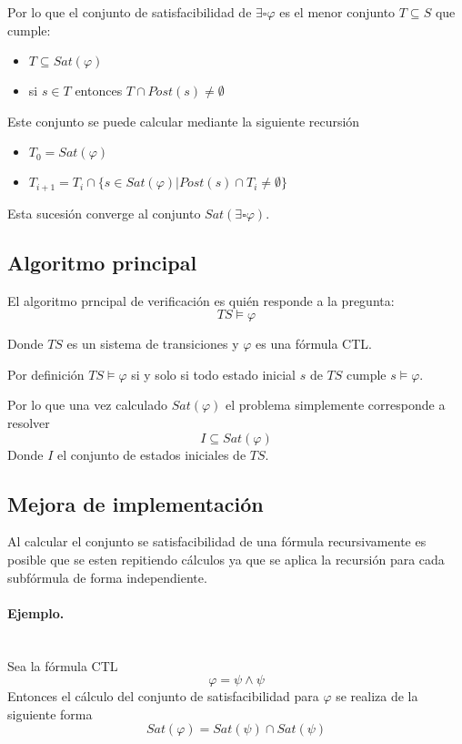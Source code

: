Por lo que el conjunto de satisfacibilidad de $\exists \square \varphi$ es el
 menor conjunto $T \subseteq S$ que cumple:

\begin{itemize}
\item $T \subseteq Sat(\varphi)$
\item si $s \in T$ entonces $T \cap Post(s) \neq \emptyset$

\end{itemize}

Este conjunto se puede calcular mediante la siguiente recursión
\begin{itemize}
\item $T_0 = Sat(\varphi)$
\item $T_{i+1} = T_i \cap \{ s \in Sat(\varphi) | Post(s) \cap T_i \neq \emptyset \} $

\end{itemize}

Esta sucesión converge al conjunto $Sat(\exists \square \varphi)$.

\subsection{Algoritmo principal}
El algoritmo prncipal de verificación es quién responde a la pregunta:
\[ TS \models \varphi \]

Donde $TS$ es un sistema de transiciones y $\varphi$ es una fórmula CTL.

Por definición $TS \models \varphi $ si y solo si todo estado inicial $s$ de $TS$
 cumple $s \models \varphi$.
 
Por lo que una vez calculado $Sat(\varphi)$ el problema simplemente corresponde
a resolver
\[ I \subseteq Sat(\varphi) \]
Donde $I$ el conjunto de estados iniciales de $TS$.


\subsection{Mejora de implementación}
Al calcular el conjunto se satisfacibilidad de una fórmula recursivamente es posible
 que se esten repitiendo cálculos ya que se aplica la recursión para cada subfórmula
 de forma independiente.

\paragraph{Ejemplo.} ~\\
Sea la fórmula CTL
\[ \varphi = \psi \wedge \psi \]
Entonces el cálculo del conjunto de satisfacibilidad para $\varphi$ se realiza de
 la siguiente forma
\[ Sat(\varphi) = Sat(\psi) \cap Sat(\psi) \]


